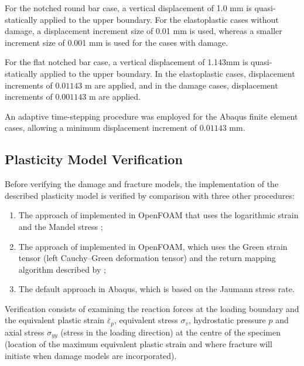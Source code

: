 \documentclass[sn-mathphys,Numbered,draft]{sn-jnl}%
\begin{document}
For the notched round bar case, a vertical displacement of 1.0 mm is quasi-statically applied to the upper boundary.
For the elastoplastic cases without damage, a displacement increment size of 0.01 mm is used, whereas a smaller increment size of 0.001 mm is used for the cases with damage.


For the flat notched bar case, a vertical displacement of 1.143mm is quasi-statically applied to the upper boundary.
In the elastoplastic cases, displacement increments of $0.01143$ m are applied, and in the damage cases, displacement increments of $0.001143$ m are applied.

An adaptive time-stepping procedure was employed for the Abaqus finite element cases, allowing a minimum displacement increment of $0.01143$ mm.





\subsection{Plasticity Model Verification} \label{PlasticityTestCases}

Before verifying the damage and fracture models, the implementation of the described plasticity model is verified by comparison with three other procedures:
\begin{enumerate}[label=(\alph*)]
	\item The approach of \citet{clancy_improving_2019} implemented in OpenFOAM that uses the logarithmic strain and the Mandel stress \cite{caminero_modeling_2011};
	\item The approach of \citet{cardiff_lagrangian_2017} implemented in OpenFOAM, which uses the Green strain tensor (left Cauchy–Green deformation tensor) and the return mapping algorithm described by \citet{simo_computational_1998};
	\item The default approach in Abaqus, which is based on the Jaumann stress rate.
\end{enumerate}

Verification consists of examining the reaction forces at the loading boundary and the equivalent plastic strain $\bar{\varepsilon}_p$, equivalent stress $\sigma_v$, hydrostatic pressure $p$ and axial stress $\sigma_{yy}$ (stress in the loading direction) at the centre of the specimen (location of the maximum equivalent plastic strain and where fracture will initiate when damage models are incorporated).
\end{document}
